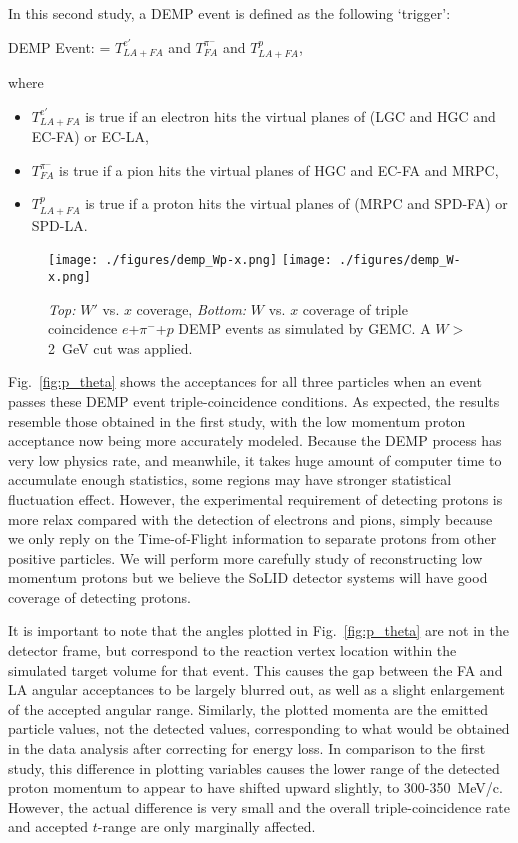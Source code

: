 In this second study, a DEMP event is defined as the following `trigger':
\begin{center}
DEMP Event: =  $T^{e'}_{LA+FA}$ and $T^{\pi^{-}}_{FA}$  and $T^{p}_{LA+FA}$,
\end{center}
where
\begin{itemize}
\item  $T^{e'}_{LA+FA}$ is true if an electron hits the virtual planes of (LGC and
HGC and EC-FA) or EC-LA,
\item $T^{\pi^{-}}_{FA}$ is true if a pion hits the virtual planes of HGC and EC-FA and
MRPC,
\item $T^{p}_{LA+FA}$ is true if a proton hits the virtual planes of (MRPC and SPD-FA)
or SPD-LA.
\end{itemize}

\begin{figure}[!ht]
 \begin{center}
      \texttt{[image: ./figures/demp\_Wp-x.png]}
      \texttt{[image: ./figures/demp\_W-x.png]}
   \caption{\footnotesize{{\em Top:} $W'$ vs. $x$ coverage, {\em Bottom:} $W$
       vs. $x$ coverage of triple coincidence $e$+$\pi^-$+$p$ DEMP events as
       simulated by GEMC.  A $W>$2~GeV cut was applied.}}
  \label{fig:Wp_x}
  \end{center}
\end{figure}

Fig.~\ref{fig:p_theta} shows the acceptances for all three particles when an
event passes these DEMP event triple-coincidence conditions.  As expected, the
results resemble those obtained in the first study, with the low
momentum proton acceptance now being more accurately modeled. 
Because the DEMP process has very low physics rate, and meanwhile, it takes huge amount of computer time  to accumulate enough statistics, some regions may have stronger statistical fluctuation effect. However, the experimental requirement of detecting protons is more relax compared with the detection of electrons and pions, simply because we only reply on the Time-of-Flight information to separate protons from other positive particles. We will perform more carefully study of reconstructing low momentum protons but we believe the SoLID detector systems will have good coverage of detecting protons.

It is important to note that the angles plotted in Fig.~\ref{fig:p_theta} are not in the
detector frame, but correspond to the reaction vertex location within
the simulated target volume for that event.  This causes the gap between the FA
and LA angular acceptances to be largely blurred out, as well as a slight
enlargement of the accepted angular range.  Similarly, the plotted momenta
are the emitted particle values, not the detected values, corresponding to what
would be obtained in the data analysis after correcting for energy loss.  In 
comparison to the first study, this difference in plotting variables causes the 
lower range of the detected proton momentum to appear to have shifted upward
slightly, to 300-350~MeV/c.  However, the actual difference is very small and
the overall triple-coincidence rate and accepted $t$-range are only marginally
affected.

